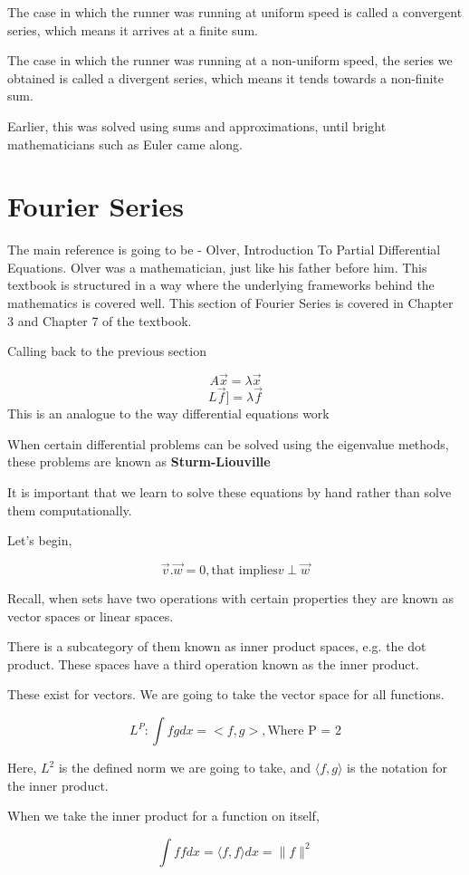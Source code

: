 \documentclass[twoside]{report}
\begin{document}
The case in which the runner was running at uniform speed is called a convergent series, which means it arrives at a finite sum.

The case in which the runner was running at a non-uniform speed, the series we obtained is called a divergent series, which means it tends towards a non-finite sum.

Earlier, this was solved using sums and approximations, until bright mathematicians such as Euler came along.
\section{Fourier Series}
The main reference is going to be - Olver, Introduction To Partial Differential Equations. Olver was a mathematician, just like his father before him. This textbook is structured in a way where the underlying frameworks behind the mathematics is covered well. This section of Fourier Series is covered in Chapter 3 and Chapter 7 of the textbook.

Calling back to the previous section 

\[A \vec{x} = \lambda \vec{x}\]
\[L \vec{f}] = \lambda \vec{f}\]
This is an analogue to the way differential equations work

When certain differential problems can be solved using the eigenvalue methods, these problems are known as \textbf{Sturm-Liouville}

It is important that we learn to solve these equations by hand rather than solve them computationally.

Let's begin,

\[\vec{v}.\vec{w} = 0, \text{that implies} v \perp \vec{w}\]

Recall, when sets have two operations with certain properties they are known as vector spaces or linear spaces.

There is a subcategory of them known as inner product spaces, e.g. the dot product. These spaces have a third operation known as the inner product.

These exist for vectors. We are going to take the vector space for all functions.

\[L^P: \int f g dx = <f,g>, \text{Where P = 2}\]

Here, $L^2$ is the defined norm we are going to take, and $\langle f,g\rangle$ is the notation for the inner product.

When we take the inner product for a function on itself,

\[\int f f dx = \langle f,f\rangle dx = \|f\|^2\]
\end{document}

